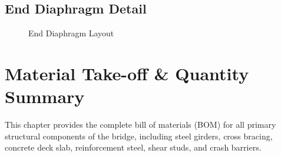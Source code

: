 \documentclass[12pt,a4paper]{report}
\numberwithin{table}{chapter}
\numberwithin{figure}{chapter}
\begin{document}
\section{End Diaphragm Detail}
\label{sec:diaphragm-detail}

\begin{figure}[H]
\centering
{}
\caption{End Diaphragm Layout}
\label{fig:ed-layout}
\end{figure}


\noindent
\begin{minipage}[t]{0.31\textwidth}
\centering
{}
\label{fig:ed-bracing-sec}
\end{minipage}
\hfill
\begin{minipage}[t]{0.31\textwidth}
\centering
{}
\label{fig:ed-top-chord}
\end{minipage}
\hfill
\begin{minipage}[t]{0.31\textwidth}
\centering
{}
\label{fig:ed-bottom-chord}
\end{minipage}



\chapter{Material Take-off \& Quantity Summary}
\label{ch:material-takeoff}

This chapter provides the complete bill of materials (BOM) for all primary
structural components of the bridge, including steel girders, cross bracing,
concrete deck slab, reinforcement steel, shear studs, and crash barriers.
\end{document}
